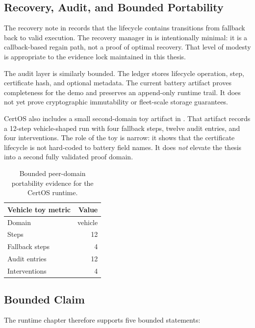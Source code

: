 \subsection{Recovery, Audit, and Bounded Portability}

The recovery note in  records that
the lifecycle contains transitions from fallback back to valid execution.
The recovery manager in  is intentionally minimal:
it is a callback-based regain path, not a proof of optimal recovery.  That
level of modesty is appropriate to the evidence lock maintained in this thesis.

The audit layer is similarly bounded.  The ledger stores lifecycle
operation, step, certificate hash, and optional metadata.  The current
battery artifact proves completeness for the demo and preserves an
append-only runtime trail.  It does not yet prove cryptographic immutability
or fleet-scale storage guarantees.

CertOS also includes a small second-domain toy artifact in
.  That artifact records a
12-step vehicle-shaped run with four fallback steps, twelve audit entries,
and four interventions.  The role of the toy is narrow: it shows that the
certificate lifecycle is not hard-coded to battery field names.  It does
\emph{not} elevate the thesis into a second fully validated proof domain.

\begin{table}[ht]
\centering
\caption{Bounded peer-domain portability evidence for the CertOS runtime.}
\label{tab:certos-vehicle-toy}
\begin{tabular}{lr}
\toprule
\textbf{Vehicle toy metric} & \textbf{Value} \\
\midrule
Domain & vehicle \\
Steps & 12 \\
Fallback steps & 4 \\
Audit entries & 12 \\
Interventions & 4 \\
\bottomrule
\end{tabular}
\end{table}

\subsection{Bounded Claim}

The runtime chapter therefore supports five bounded statements:

